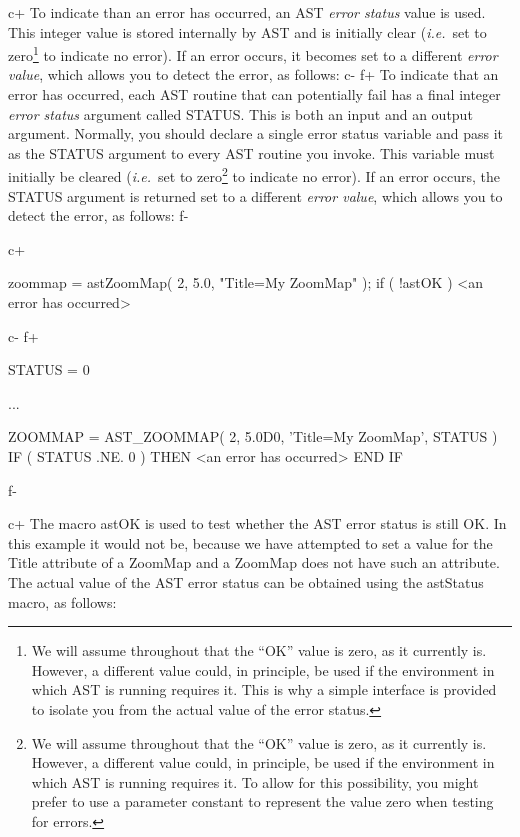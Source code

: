 \documentclass[twoside,11pt]{starlink}
\begin{document}
c+
To indicate than an error has occurred, an AST \emph{error status}
value is used. This integer value is stored internally by AST and is
initially clear (\emph{i.e.}\ set to zero\footnote{We will assume
throughout that the ``OK'' value is zero, as it currently is. However,
a different value could, in principle, be used if the environment in
which AST is running requires it. This is why a simple interface is
provided to isolate you from the actual value of the error status.}
to indicate no error). If an error occurs, it becomes set to a
different \emph{error value}, which allows you to detect the error, as
follows:
c-
f+
To indicate that an error has occurred, each AST routine that can
potentially fail has a final integer \emph{error status} argument
called STATUS.  This is both an input and an output argument.
Normally, you should declare a single error status variable and pass
it as the STATUS argument to every AST routine you invoke.  This
variable must initially be cleared (\emph{i.e.}\ set to
zero\footnote{We will assume throughout that the ``OK'' value is zero,
as it currently is. However, a different value could, in principle, be
used if the environment in which AST is running requires it. To allow
for this possibility, you might prefer to use a parameter constant to
represent the value zero when testing for errors.} to indicate no
error).  If an error occurs, the STATUS argument is returned set to a
different \emph{error value}, which allows you to detect the error, as
follows:
f-

c+
\small
\begin{terminalv}
zoommap = astZoomMap( 2, 5.0, "Title=My ZoomMap" );
if ( !astOK ) {
   <an error has occurred>
}
\end{terminalv}
\normalsize
c-
f+
\small
\begin{terminalv}
      STATUS = 0

      ...

      ZOOMMAP = AST_ZOOMMAP( 2, 5.0D0, 'Title=My ZoomMap', STATUS )
      IF ( STATUS .NE. 0 ) THEN
         <an error has occurred>
      END IF
\end{terminalv}
\normalsize
f-

c+
The macro astOK is used to test whether the AST error status is still
OK. In this example it would not be, because we have attempted to set
a value for the Title attribute of a ZoomMap and a ZoomMap does not
have such an attribute.  The actual value of the AST error status can
be obtained using the astStatus macro, as follows:
\end{document}
